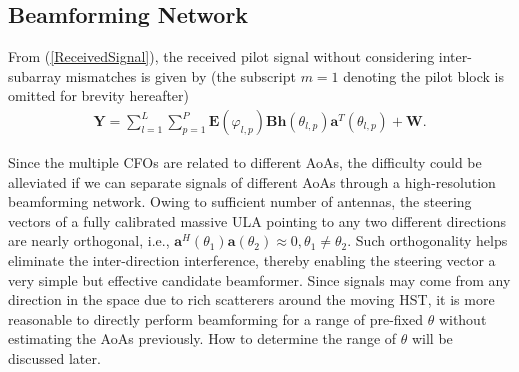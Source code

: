 \documentclass[12pt, draftclsnofoot, onecolumn]{IEEEtran}
\begin{document}
\vspace{-0.6em}
\subsection{Beamforming Network}
From (\ref{ReceivedSignal}), the received pilot signal without considering inter-subarray mismatches is given by (the subscript $m=1$ denoting the pilot block is omitted for brevity hereafter)
\begin{align}
\mathbf{Y}=\sum\limits_{l=1}^{L}{\sum\limits_{p=1}^{P}{\mathbf{E}\left( {{\varphi }_{l,p}} \right)\mathbf{Bh}\left( {{\theta }_{l,p}} \right){{\mathbf{a}}^{T}}\left( {{\theta }_{l, p}} \right)}}+\mathbf{W}.
\end{align}

Since the multiple CFOs are related to different AoAs, the difficulty could be alleviated if we can separate signals of different AoAs through a high-resolution beamforming network. Owing to sufficient number of antennas, the steering vectors of a fully calibrated massive ULA pointing to any two different directions are nearly orthogonal, i.e., ${{\mathbf{a}}^{H}}\left( {{\theta }_{1}} \right)\mathbf{a}\left( {{\theta }_{2}} \right) \approx 0, {{\theta }_{1}}\ne {{\theta }_{2}}$. Such orthogonality helps eliminate the inter-direction interference, thereby enabling the steering vector a very simple but effective candidate beamformer.
Since signals may come from any direction in the space due to rich scatterers around the moving HST, it is more reasonable to directly perform beamforming for a range of pre-fixed $\theta$ without estimating the AoAs previously. How to determine the range of $\theta$ will be discussed later.
\end{document}
